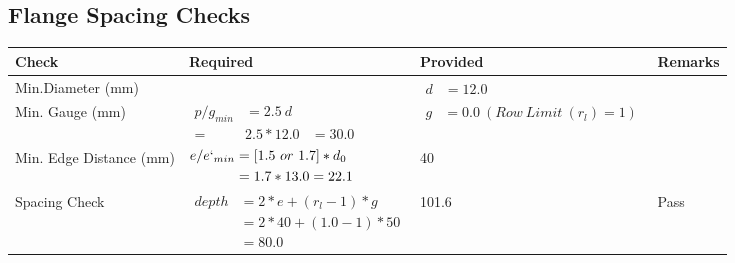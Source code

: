 \documentclass{article}%
\begin{document}
\subsection{Flange Spacing Checks}%
\label{subsec:FlangeSpacingChecks}%
\renewcommand{\arraystretch}{1.2}%
\begin{longtable}{|p{2.5cm}|p{7.5cm}|p{5cm}|p{1cm}|}%
\hline%
\rowcolor{OsdagGreen}%
Check&Required&Provided&Remarks\\%
\hline%
\endhead%
\hline%
Min.Diameter (mm)&&$\begin{aligned} d &=12.0\end{aligned}$&\\%
\hline%
Min. Gauge (mm)&$\begin{aligned}p/g_{min}&= 2.5 ~ d&\\ =&2.5*12.0&=30.0\end{aligned}$&$\begin{aligned} g &=0.0~(Row~Limit~(r_l) = 1)\end{aligned}$&\\%
\hline%
Min. Edge Distance (mm)&$\begin{aligned}e/e`_{min} &=[1.5~or~ 1.7] * d_0\\ &=1.7*13.0=22.1 \end{aligned}$&40&\\%
\hline%
Spacing Check&$\begin{aligned} depth & = 2 * e + (r_l -1) * g\\ & = 2 * 40+(1.0-1)*50\\ & = 80.0\end{aligned}$&101.6&Pass\\%
\hline%
\end{longtable}

%
\newpage%
\end{document}
